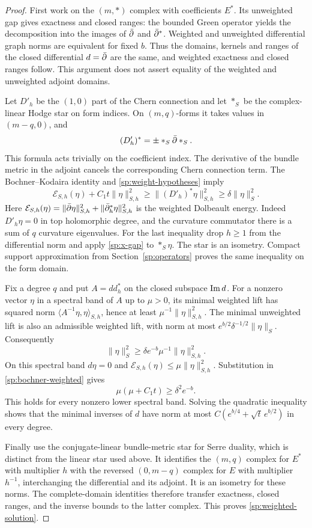 \begin{proof}
First work on the $(m,*)$ complex with coefficients $E^*$.  Its
unweighted gap gives exactness and closed ranges: the bounded Green
operator yields the decomposition into the images of $\bar\partial$ and
$\bar\partial^*$.  Weighted and unweighted differential graph norms are
equivalent for fixed $b$.  Thus the domains, kernels and ranges of the
closed differential $d=\bar\partial$ are the same, and weighted exactness and
closed ranges follow.  This argument does not assert equality of the
weighted and unweighted adjoint domains.

Let $D'_h$ be the $(1,0)$ part of the Chern connection and let $*_S$ be
the complex-linear Hodge star on form indices.  On $(m,q)$-forms it
takes values in $(m-q,0)$, and
\[
 (D'_h)^*=\pm *_S\bar\partial *_S.
\]
This formula acts trivially on the coefficient index.  The derivative of
the bundle metric in the adjoint cancels the corresponding Chern
connection term.  The Bochner--Kodaira identity and
\eqref{sp:weight-hypotheses} imply
\begin{equation}\label{sp:bochner-weighted}
 \mathcal E_{S,h}(\eta)+C_1t\|\eta\|_{S,h}^2
 \ge\|(D'_h)^*\eta\|_{S,h}^2
 \ge\delta\|\eta\|_S^2.
\end{equation}
Here
$\mathcal E_{S,h}(\eta)=
\|\bar\partial\eta\|_{S,h}^2+\|\bar\partial_h^*\eta\|_{S,h}^2$
is the weighted Dolbeault energy.
Indeed $D'_h\eta=0$ in top holomorphic degree, and the curvature
commutator there is a sum of $q$ curvature eigenvalues.  For the last
inequality drop $h\ge1$ from the differential norm and apply
\eqref{sp:x-gap} to $*_S\eta$.  The star is an isometry.  Compact
support approximation from Section~\ref{sp:operators} proves the same
inequality on the form domain.

Fix a degree $q$ and put $A=dd_h^*$ on the closed subspace
$\operatorname{Im} d$.  For a nonzero vector $\eta$ in a spectral band of $A$ up to
$\mu>0$, its minimal weighted lift has squared norm
$\langle A^{-1}\eta,\eta\rangle_{S,h}$, hence at least
$\mu^{-1}\|\eta\|_{S,h}^2$.  The minimal unweighted lift is also an
admissible weighted lift, with norm at most
$e^{b/2}\delta^{-1/2}\|\eta\|_S$.  Consequently
\[
 \|\eta\|_S^2
 \ge\delta e^{-b}\mu^{-1}\|\eta\|_{S,h}^2.
\]
On this spectral band $d\eta=0$ and
$\mathcal E_{S,h}(\eta)\le\mu\|\eta\|_{S,h}^2$.
Substitution in \eqref{sp:bochner-weighted} gives
\begin{equation}\label{sp:spectral-quadratic}
 \mu(\mu+C_1t)\ge\delta^2e^{-b}.
\end{equation}
This holds for every nonzero lower spectral band.  Solving the quadratic
inequality shows that the minimal inverses of $d$ have norm at most
$C(e^{b/4}+\sqrt t\,e^{b/2})$ in every degree.

Finally use the conjugate-linear bundle-metric star for Serre duality,
which is distinct from the linear star used above.  It identifies the
$(m,q)$ complex for $E^*$ with multiplier $h$ with the reversed
$(0,m-q)$ complex for $E$ with multiplier $h^{-1}$, interchanging the
differential and its adjoint.  It is an isometry for these norms.  The
complete-domain identities therefore transfer exactness, closed ranges,
and the inverse bounds to the latter complex.  This proves
\eqref{sp:weighted-solution}.
\end{proof}

